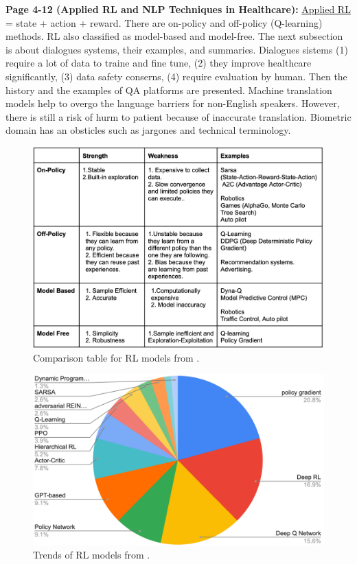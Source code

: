     \textbf{Page 4-12 (Applied RL and NLP Techniques in Healthcare):}
    \underline{Applied RL} = state + action + reward. There are on-policy and off-policy (Q-learning) methods. RL also classified as model-based and model-free. The next subsection is about dialogues systems, their examples, and summaries. Dialogues sistems (1) require a lot of data to traine and fine tune, (2) they improve healthcare significantly, (3) data safety conserns, (4) require evaluation by human. Then the history and the examples of QA platforms are presented. Machine translation models help to overgo the language barriers for non-English speakers. However, there is still a risk of hurm to patient because of inaccurate translation. Biometric domain has an obsticles such as jargones and technical terminology.
    \begin{figure}[H]
        \centering
        \includegraphics[width=1\textwidth]{figures/SR0022US23/fig4.png}
        \caption{Comparison table for RL models from \cite{x090}.}
        \label{fig4:SR0022US23}
    \end{figure}
    \begin{figure}[H]
        \centering
        \includegraphics[width=1\textwidth]{figures/SR0022US23/fig5.png}
        \caption{Trends of RL models from \cite{x090}.}
        \label{fig5:SR0022US23}
    \end{figure}

